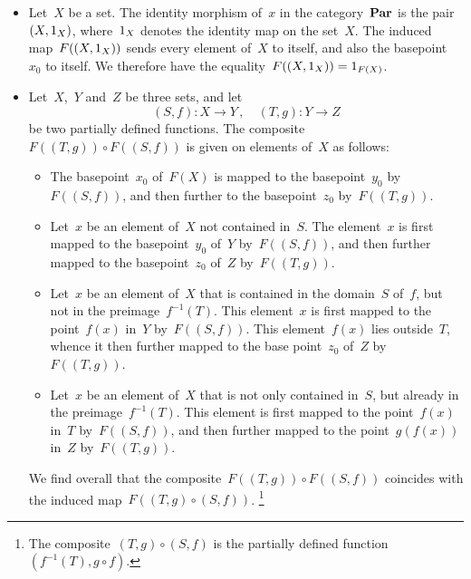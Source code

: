 \begin{itemize}

	\item
		Let~$X$ be a set.
		The identity morphism of~$x$ in the category~$\mathbf{Par}$ is the pair~$(X, 1_X)$, where~$1_X$ denotes the identity map on the set~$X$.
		The induced map~$F( (X, 1_X) )$ sends every element of~$X$ to itself, and also the basepoint~$x_0$ to itself.
		We therefore have the equality~$F( (X, 1_X) ) = 1_{F(X)}$.

	\item
		Let~$X$,~$Y$ and~$Z$ be three sets, and let
		\[
			(S, f) \colon X \to Y \,,
			\quad
			(T, g) \colon Y \to Z
		\]
		be two partially defined functions.
		The composite~$F( (T, g) ) ∘ F( (S, f) )$ is given on elements of~$X$ as follows:
		\begin{itemize}

			\item
				The basepoint~$x_0$ of~$F(X)$ is mapped to the basepoint~$y_0$ by~$F( (S, f) )$, and then further to the basepoint~$z_0$ by~$F( (T, g) )$.

			\item
				Let~$x$ be an element of~$X$ not contained in~$S$.
				The element~$x$ is first mapped to the basepoint~$y_0$ of~$Y$ by~$F( (S, f) )$, and then further mapped to the basepoint~$z_0$ of~$Z$ by~$F( (T, g) )$.

			\item
				Let~$x$ be an element of~$X$ that is contained in the domain~$S$ of~$f$, but not in the preimage~$f^{-1}(T)$.
				This element~$x$ is first mapped to the point~$f(x)$ in~$Y$ by~$F( (S, f) )$.
				This element~$f(x)$ lies outside~$T$, whence it then further mapped to the base point~$z_0$ of~$Z$ by~$F( (T, g) )$.

			\item
				Let~$x$ be an element of~$X$ that is not only contained in~$S$, but already in the preimage~$f^{-1}(T)$.
				This element is first mapped to the point~$f(x)$ in~$T$ by~$F( (S, f) )$, and then further mapped to the point~$g(f(x) )$ in~$Z$ by~$F( (T, g) )$.

		\end{itemize}
		We find overall that the composite~$F( (T, g) ) ∘ F( (S, f) )$ coincides with the induced map~$F( (T, g) ∘ (S, f) )$.%
		\footnote{
			The composite~$(T, g) ∘ (S, f)$ is the partially defined function~$(f^{-1}(T), g ∘ f)$.
		}
\end{itemize}

